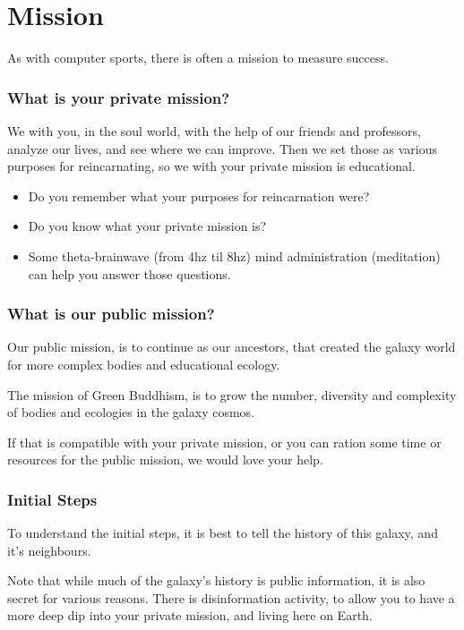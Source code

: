 \chapter{Mission}\label{mission}

As with computer sports, there is often a mission to measure success.

\subsection{What is your private mission?}

We with you, in the soul world, with the help of our friends and professors,
 analyze our lives, and see where we can improve. Then we set those as various
purposes for reincarnating, so we with your private mission is educational.

\begin{itemize}
\item Do you remember what your purposes for reincarnation were?
\item Do you know what your private mission is?
\item Some theta-brainwave (from 4hz til 8hz) mind administration (meditation) can help you answer those
questions. 
\end{itemize}

\subsection{What is our public mission?}

Our public mission, is to continue as our ancestors, that created the galaxy
world for more complex bodies and educational ecology.  


The mission of Green Buddhism, is to grow the number, diversity and complexity of bodies and
ecologies in the galaxy cosmos. 

If that is compatible with your private mission, or you can ration some time or
resources for
the public mission, we would love your help.

\subsection{Initial Steps}

To understand the initial steps, it is best to tell the history of this galaxy,
and it's neighbours.

Note that while much of the galaxy's history is public information, it is also
secret for various reasons. There is disinformation activity, to allow you to
have a more deep dip into your private mission, and living here on Earth.

